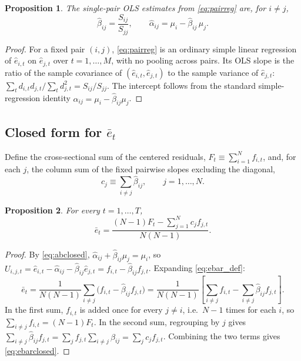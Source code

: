 \documentclass[12pt]{article}
\newtheorem{proposition}{Proposition}
\begin{document}
\begin{proposition}
\label{prop:ab}
The single-pair OLS estimates from \eqref{eq:pairreg} are, for $i\ne j$,
\begin{equation}
\hat\beta_{ij} = \frac{S_{ij}}{S_{jj}}, \qquad
\hat\alpha_{ij} = \mu_i - \hat\beta_{ij}\,\mu_j.
\label{eq:abclosed}
\end{equation}
\end{proposition}

\begin{proof}
For a fixed pair $(i,j)$, \eqref{eq:pairreg} is an ordinary simple linear
regression of $\hat e_{i,t}$ on $\hat e_{j,t}$ over $t=1,\dots,M$, with no
pooling across pairs. Its OLS slope is the ratio of the sample covariance
of $(\hat e_{i,t},\hat e_{j,t})$ to the sample variance of $\hat e_{j,t}$:
$\sum_t d_{i,t}d_{j,t}\big/\sum_t d_{j,t}^2 = S_{ij}/S_{jj}$. The intercept
follows from the standard simple-regression identity
$\hat\alpha_{ij} = \mu_i - \hat\beta_{ij}\mu_j$.
\end{proof}

\subsection{Closed form for $\bar e_t$}

Define the cross-sectional sum of the centered residuals,
$F_t \equiv \sum_{i=1}^N f_{i,t}$, and, for each $j$, the column sum of
the fixed pairwise slopes excluding the diagonal,
\begin{equation}
c_j \equiv \sum_{i\ne j} \hat\beta_{ij}, \qquad j=1,\dots,N.
\label{eq:cj}
\end{equation}

\begin{proposition}
\label{prop:ebar}
For every $t=1,\dots,T$,
\begin{equation}
\bar e_t = \frac{(N-1)F_t - \displaystyle\sum_{j=1}^N c_j f_{j,t}}{N(N-1)}.
\label{eq:ebarclosed}
\end{equation}
\end{proposition}

\begin{proof}
By \eqref{eq:abclosed}, $\hat\alpha_{ij}+\hat\beta_{ij}\mu_j=\mu_i$, so
$U_{i,j,t}=\hat e_{i,t}-\hat\alpha_{ij}-\hat\beta_{ij}\hat e_{j,t}
=f_{i,t}-\hat\beta_{ij}f_{j,t}$. Expanding \eqref{eq:ebar_def}:
\[
\bar e_t = \frac{1}{N(N-1)}\sum_{i\ne j}\bigl(f_{i,t}-\hat\beta_{ij}f_{j,t}\bigr)
= \frac{1}{N(N-1)}\left[\sum_{i\ne j} f_{i,t}
  - \sum_{i\ne j}\hat\beta_{ij}f_{j,t}\right].
\]
In the first sum, $f_{i,t}$ is added once for every $j\ne i$, i.e.\ $N-1$
times for each $i$, so $\sum_{i\ne j}f_{i,t}=(N-1)F_t$. In the second sum,
regrouping by $j$ gives $\sum_{i\ne j}\hat\beta_{ij}f_{j,t}
=\sum_j f_{j,t}\sum_{i\ne j}\hat\beta_{ij}=\sum_j c_j f_{j,t}$. Combining
the two terms gives \eqref{eq:ebarclosed}.
\end{proof}
\end{document}
